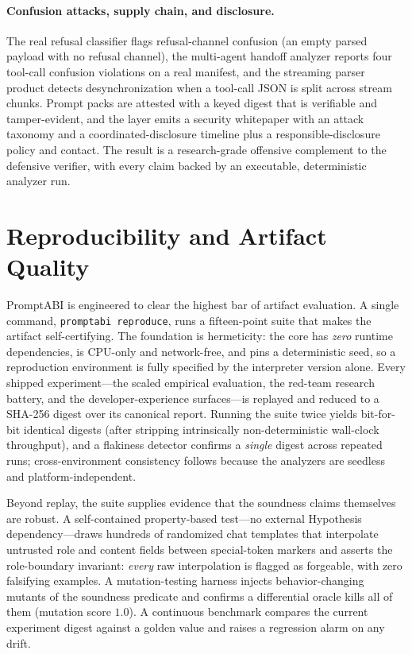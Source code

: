 \documentclass[10pt]{article}
\begin{document}
\paragraph{Confusion attacks, supply chain, and disclosure.}
The real refusal classifier flags refusal-channel confusion (an empty parsed
payload with no refusal channel), the multi-agent handoff analyzer reports four
tool-call confusion violations on a real manifest, and the streaming parser
product detects desynchronization when a tool-call JSON is split across stream
chunks. Prompt packs are attested with a keyed digest that is verifiable and
tamper-evident, and the layer emits a security whitepaper with an attack taxonomy
and a coordinated-disclosure timeline plus a responsible-disclosure policy and
contact. The result is a research-grade offensive complement to the defensive
verifier, with every claim backed by an executable, deterministic analyzer run.


\section{Reproducibility and Artifact Quality}
PromptABI is engineered to clear the highest bar of artifact evaluation. A
single command, \texttt{promptabi reproduce}, runs a fifteen-point suite that
makes the artifact self-certifying. The foundation is hermeticity: the core has
\emph{zero} runtime dependencies, is CPU-only and network-free, and pins a
deterministic seed, so a reproduction environment is fully specified by the
interpreter version alone. Every shipped experiment---the scaled empirical
evaluation, the red-team research battery, and the developer-experience
surfaces---is replayed and reduced to a SHA-256 digest over its canonical
report. Running the suite twice yields bit-for-bit identical digests (after
stripping intrinsically non-deterministic wall-clock throughput), and a
flakiness detector confirms a \emph{single} digest across repeated runs;
cross-environment consistency follows because the analyzers are seedless and
platform-independent.

Beyond replay, the suite supplies evidence that the soundness claims themselves
are robust. A self-contained property-based test---no external Hypothesis
dependency---draws hundreds of randomized chat templates that interpolate
untrusted role and content fields between special-token markers and asserts the
role-boundary invariant: \emph{every} raw interpolation is flagged as forgeable,
with zero falsifying examples. A mutation-testing harness injects
behavior-changing mutants of the soundness predicate and confirms a differential
oracle kills all of them (mutation score $1.0$). A continuous benchmark compares
the current experiment digest against a golden value and raises a regression
alarm on any drift.
\end{document}
